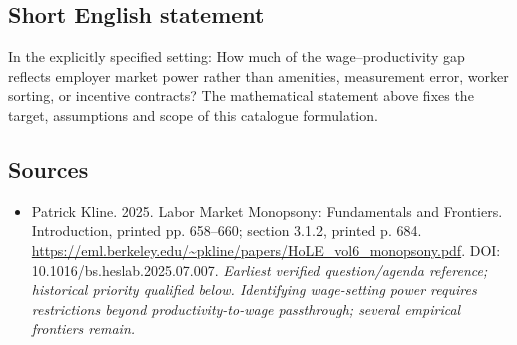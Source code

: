 \documentclass[11pt]{article}
\begin{document}
\subsection{Short English statement}
In the explicitly specified setting: How much of the wage–productivity gap reflects employer market power rather than amenities, measurement error, worker sorting, or incentive contracts? The mathematical statement above fixes the target, assumptions and scope of this catalogue formulation.

\subsection{Sources}
\begin{itemize}\raggedright
\item[\textnormal{[S1]}]\hypertarget{source:30007632:1}{} Patrick Kline. 2025. Labor Market Monopsony: Fundamentals and Frontiers. Introduction, printed pp. 658–660; section 3.1.2, printed p. 684.
\url{https://eml.berkeley.edu/~pkline/papers/HoLE_vol6_monopsony.pdf}.
DOI: 10.1016/bs.heslab.2025.07.007.
{\small\textit{Earliest verified question/agenda reference; historical priority qualified below. Identifying wage-setting power requires restrictions beyond productivity-to-wage passthrough; several empirical frontiers remain.}}
\end{itemize}
\end{document}
